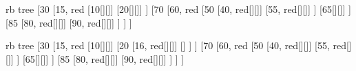 


\begin{page}
	\begin{forest} rb tree
		[30
			[15, red
				[10[][]]
				[20[][]]
			]
			[70
				[60, red
					[50
						[40, red[][]]
						[55, red[][]]
					]
					[65[][]]
				]
				[85
					[80, red[][]]
					[90, red[][]]
				]
			]
		]
	\end{forest}
\end{page}

\begin{page}
	\begin{forest} rb tree
		[30
			[15, red
				[10[][]]
				[20
					[16, red[][]]
					[]
				]
			]
			[70
				[60, red
					[50
						[40, red[][]]
						[55, red[][]]
					]
					[65[][]]
				]
				[85
					[80, red[][]]
					[90, red[][]]
				]
			]
		]
	\end{forest}
\end{page}


